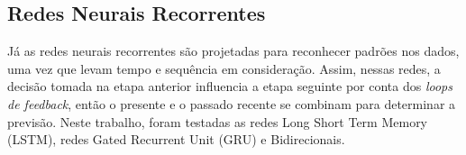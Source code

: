         
\subsection{Redes Neurais Recorrentes}
  
Já as redes neurais recorrentes são projetadas para reconhecer padrões nos dados, uma vez que levam tempo e sequência em consideração. Assim, nessas redes, a decisão tomada na etapa anterior influencia a etapa seguinte por conta dos \textit{loops de feedback}, então o presente e o passado recente se combinam para determinar a previsão. Neste trabalho, foram testadas as redes Long Short Term Memory (LSTM), redes Gated Recurrent Unit (GRU) e Bidirecionais.
  